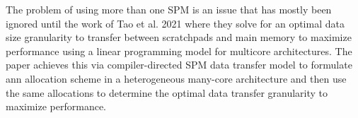The problem of using more than one SPM is an issue that has mostly been ignored
until the work of Tao et  al. 2021 where they solve for an optimal data size
granularity to transfer between scratchpads and main memory to maximize performance
using a linear programming model for multicore architectures. The paper achieves
this via compiler-directed SPM data transfer model to formulate ann allocation
scheme in a heterogeneous many-core architecture and then use the same allocations
to determine the optimal data transfer granularity to maximize performance.

